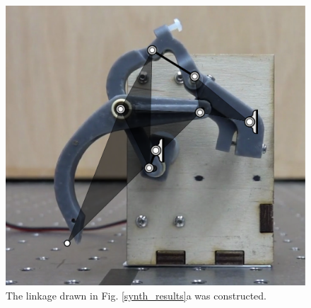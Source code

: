 \documentclass[journal]{IEEEtran}
\begin{document}
\begin{figure}[!t]
\centering
\includegraphics[scale=0.3]{prototype_overlay}
\caption{The linkage drawn in Fig. \ref{synth_results}a was constructed.}
\label{prototype_overlay}
\end{figure}
\end{document}

